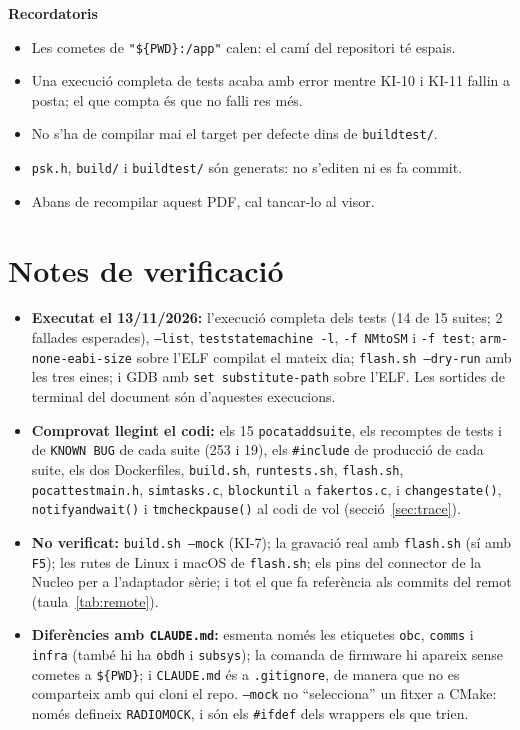 \documentclass[11pt,a4paper]{article}
\DeclareRobustCommand{\_}{\textunderscore\allowbreak}
\newcommand{\cd}[1]{\texttt{#1}}
\newcommand{\PWD}{\$\{PWD\}}
\begin{document}
\textbf{Recordatoris}
\begin{itemize}
\item Les cometes de \cd{"\PWD:/app"} calen: el camí del repositori té espais.
\item Una execució completa de tests acaba amb error mentre KI-10 i KI-11 fallin a posta;
  el que compta és que no falli res més.
\item No s'ha de compilar mai el target per defecte dins de \cd{build\_test/}.
\item \cd{psk.h}, \cd{build/} i \cd{build\_test/} són generats: no s'editen ni es fa commit.
\item Abans de recompilar aquest PDF, cal tancar-lo al visor.
\end{itemize}

\section{Notes de verificació}

\begin{itemize}
\item \textbf{Executat el 13/11/2026:} l'execució completa dels tests (14 de 15 suites; 2 fallades
  esperades), \cd{--list}, \cd{test\_state\_machine -l}, \cd{-f NM\_to\_SM} i \cd{-f test\_};
  \cd{arm-none-eabi-size} sobre l'ELF compilat el mateix dia; \cd{flash.sh --dry-run} amb les tres
  eines; i GDB amb \cd{set substitute-path} sobre l'ELF. Les sortides de terminal del document
  són d'aquestes execucions.
\item \textbf{Comprovat llegint el codi:} els 15 \cd{pocat\_add\_suite}, els recomptes de tests i de
  \cd{KNOWN BUG} de cada suite (253 i 19), els \cd{\#include} de producció de cada suite, els dos
  Dockerfiles, \cd{build.sh}, \cd{run\_tests.sh}, \cd{flash.sh}, \cd{pocat\_test\_main.h},
  \cd{sim\_tasks.c}, \cd{block\_until} a \cd{fake\_rtos.c}, i \cd{change\_state()},
  \cd{notify\_and\_wait()} i \cd{tm\_check\_pause()} al codi de vol (secció~\ref{sec:trace}).
\item \textbf{No verificat:} \cd{build.sh --mock} (KI-7); la gravació real amb \cd{flash.sh} (sí amb
  \cd{F5}); les rutes de Linux i macOS de \cd{flash.sh}; els pins del connector de la Nucleo per a
  l'adaptador sèrie; i tot el que fa referència als commits del remot (taula~\ref{tab:remote}).
\item \textbf{Diferències amb \cd{CLAUDE.md}:} esmenta només les etiquetes \cd{obc}, \cd{comms} i
  \cd{infra} (també hi ha \cd{obdh} i \cd{subsys}); la comanda de firmware hi apareix sense cometes
  a \cd{\$\{PWD\}}; i \cd{CLAUDE.md} és a \cd{.gitignore}, de manera que no es comparteix amb qui
  cloni el repo. \cd{--mock} no ``selecciona'' un fitxer a CMake: només defineix \cd{RADIO\_MOCK},
  i són els \cd{\#ifdef} dels wrappers els que trien.
\end{itemize}
\end{document}
